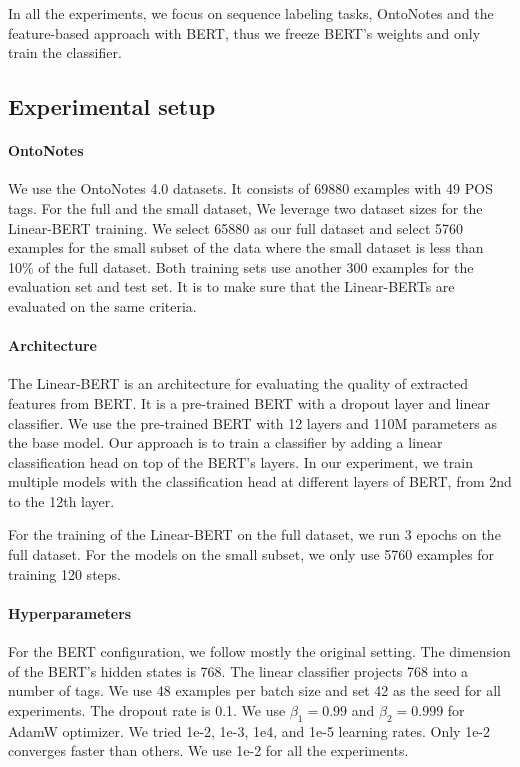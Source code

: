 \documentclass[11pt,a4paper]{article}
\begin{document}
In all the experiments, we focus on sequence labeling tasks, OntoNotes and the feature-based approach with BERT, thus we freeze BERT's weights and only train the classifier.

\subsection{Experimental setup}

\paragraph{OntoNotes} We use the OntoNotes 4.0 datasets. It consists of 69880 examples with 49 POS tags. For the full and the small dataset,
We leverage two dataset sizes for the Linear-BERT training. We select 65880 as our  full dataset and select 5760 examples
for the small subset of the data where the small dataset is less than 10\% of the full dataset. Both training sets use another 300 examples for the evaluation set and test set. It is to make sure that the Linear-BERTs are evaluated on the same criteria.



\paragraph{Architecture}

The Linear-BERT is an architecture for evaluating the quality of extracted features from BERT. It is a pre-trained BERT with a dropout layer and linear classifier. We use the pre-trained BERT with 12 layers and 110M parameters as the base model. Our approach is to train a classifier by adding a linear classification head on top of the BERT's layers. In our experiment, we train multiple models with the classification head at different layers of BERT, from 2nd to the 12th layer. 

For the training of the Linear-BERT on the full dataset, we run 3 epochs on the full dataset. For the models on the small subset, we only use 5760 examples for training 120 steps. 


\paragraph{Hyperparameters}
For the BERT configuration, we follow mostly the original setting. The dimension of the BERT's hidden states is 768. The linear classifier projects 768 into a number of tags. We use 48 examples per batch size and set 42 as the seed for all experiments. The dropout rate is 0.1. We use $\beta_{1} = 0.99 $ and $\beta_{2} = 0.999 $ for AdamW optimizer. We tried  1e-2, 1e-3, 1e4, and 1e-5 learning rates. Only 1e-2 converges faster than others. We use 1e-2 for all the experiments. 
\end{document}
